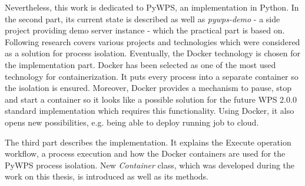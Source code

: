 Nevertheless, this work is dedicated to PyWPS, an implementation in
Python. In the second part, its current state is described as well as
\textit{pywps-demo} - a side project providing demo server instance -
which the practical part is based on. Following research 
covers various projects and technologies which were considered as a
solution for process isolation. Eventually, the Docker technology is
chosen for the implementation part.  Docker has been selected as one
of the most used technology for containerization. It puts every
process into a separate container so the isolation is
ensured. Moreover, Docker provides a mechanism to pause, stop and
start a container so it looks like a possible solution for the future
WPS 2.0.0 standard implementation which requires this
functionality. Using Docker, it also opens new possibilities,
e.g. being able to deploy running job to cloud.

The third part describes the implementation. It explains the Execute
operation workflow, a process execution and how the Docker containers
are used for the PyWPS process isolation. New \textit{Container}
class, which was developed during the work on this thesis, is
introduced as well as its methods.
